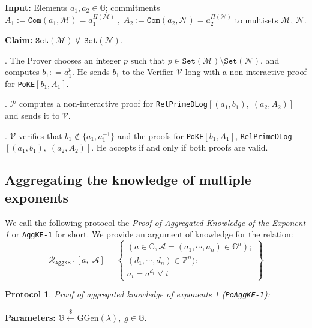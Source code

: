 \documentclass[11pt, lettersize, notitlepage, leqno, footskip=0.6cm]{article}
\newcommand{\bz}{\mathbb Z}
\newcommand{\ttt}{\texttt}
\newcommand{\sett}{\ttt{Set}}
\newcommand{\mc}{\mathcal}
\newcommand{\mb}{\mathbb}
\newcommand{\mr}{\mathrm}
\newcommand{\lamb}{\lambda}
\newcommand{\nsub}{\nsubseteq}
\newcommand{\mP}{\mc{P}}
\newcommand{\V}{\mc{V}}
\newcommand{\noin}{\noindent}
\newtheorem{Prot}[Thm]{Protocol}
\numberwithin{equation}{section}
\begin{document}
\noin \textbf{Input:} Elements $a_1,a_2\in\mb{G}$; commitments $A_1 := \ttt{Com}(a_1, \mc{M}) = a_1^{\Pi(\mc{M})}\;,\;A_2 := \ttt{Com}(a_2, \mc{N})= a_2^{\Pi(\mc{N})}$ to multisets $\mc{M}$, $\mc{N}$.

\noin \textbf{Claim:} $\sett(\mc{M})\nsub \sett(\mc{N})$.

\begin{prf1}\normalfont \noin 1. The Prover chooses an integer $p$ such that $p\in \sett(\mc{M})\setminus \sett(\mc{N}).$ and computes $b_1: = a_1^p$. He sends $b_1$ to the Verifier $\V$ long with a non-interactive proof for \verb|PoKE|$[b_1, A_1]$.

\noin 2. $\mP$ computes a non-interactive proof for \verb|RelPrimeDLog|$[(a_1, b_1),\; (a_2, A_2)]$ and sends it to $\V$.

\noin 3. $\V$ verifies that $b_1\notin \{ a_1, a_1^{-1}\}$ and the proofs for \verb|PoKE|$[b_1, A_1]$, \verb|RelPrimeDLog|$[(a_1, b_1),\; (a_2, A_2)]$. He accepts if and only if both proofs are valid.\end{prf1}


\bigskip



\subsection{\fontsize{11}{11}\selectfont Aggregating the knowledge of multiple exponents}

We call the following protocol the \textit{Proof of Aggregated Knowledge of the Exponent 1} or \verb|AggKE-1| for short. We provide an argument of knowledge for the relation:
\[
  \mc{R}_{{\ttt{AggKE-1}}}[a,\; \mc{A}] = \left\{\begin{array}{l}
    (a\in\mb{G}, \mc{A} = (a_1,\cdots, a_n)\in\mb{G}^n);\\ 
    (d_1,\cdots,d_n)\in\bz^n):  \\
    a_i = a^{d_i}\;\forall\; i
  \end{array}\right\}
\]


\vspace{0.1cm}

\begin{Prot} \normalfont \textit{Proof of aggregated knowledge of exponents} 1 (\verb|PoAggKE-1|):\end{Prot} \vspace{-0.3cm}

\noindent \textbf{Parameters:} $\mb{G}\xleftarrow{\$} \mr{GGen}(\lamb), \; g\in \mb{G}$.
\end{document}
